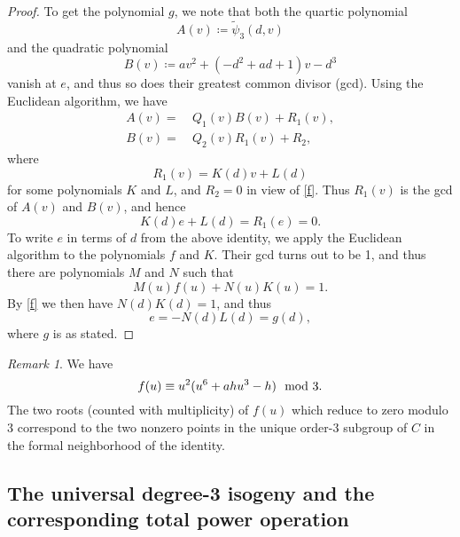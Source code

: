\documentclass{gtpart}
\theoremstyle{definition}
\theoremstyle{remark}
\newtheorem{rmk}[thm]{Remark}
\newcommand{\TP}{\widetilde{\psi}}
\newcommand{\md}{~~{\rm mod}~}
\begin{document}
\begin{proof}
 To get the polynomial $g$, we note that both the quartic polynomial 
 \[
  A(v) \coloneqq \TP_3(d,v) 
 \]
 and the quadratic polynomial 
 \[
  B(v) \coloneqq a v^2 + (-d^2 + a d + 1) v - d^3 
 \]
 vanish at $e$, and thus so does their greatest common divisor (gcd).  Using the Euclidean algorithm, we have 
 \begin{equation*}
 \begin{split}
  A(v) = & ~ Q_1(v) B(v) + R_1(v), \\
  B(v) = & ~ Q_2(v) R_1(v) + R_2, 
 \end{split}
 \end{equation*}
 where 
 \[
  R_1(v) = K(d) v + L(d) 
 \]
 for some polynomials $K$ and $L$, and $R_2 = 0$ in view of \eqref{f}.  Thus $R_1(v)$ is the gcd of $A(v)$ and $B(v)$, and hence 
 \[
  K(d) e + L(d) = R_1(e) = 0.  
 \]
 To write $e$ in terms of $d$ from the above identity, we apply the Euclidean algorithm to the polynomials $f$ and $K$.  
 Their gcd turns out to be 1, and thus there are polynomials $M$ and $N$ such that 
 \[
  M(u) f(u) + N(u) K(u) = 1.  
 \]
 By \eqref{f} we then have $N(d) K(d) = 1$, and thus 
 \[
  e = -N(d) L(d) = g(d), 
 \]
 where $g$ is as stated.  
\end{proof}

\begin{rmk}
\label{rmk:dmod3}
 We have 
 \[
  f(u) \equiv u^2 (u^6 + a h u^3 - h) \md 3.  
 \]
 The two roots (counted with multiplicity) of $f(u)$ which reduce to zero modulo 3 correspond to 
 the two nonzero points in the unique order-3 subgroup of $C$ in the formal neighborhood of the identity.  
\end{rmk}


\subsection{The universal degree-3 isogeny and the corresponding total power operation}
\end{document}
